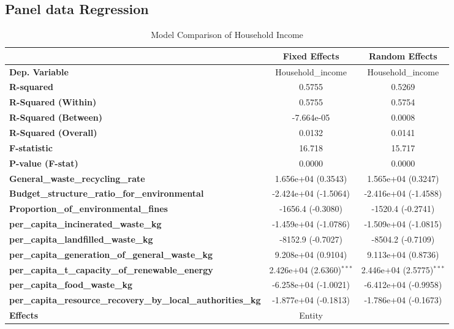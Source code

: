 \documentclass{article}
\begin{document}
\newpage
\subsection{Panel data Regression}
\begin{table}[H]
    \caption{Model Comparison of Household Income}
    \begin{tabular}{lcc}
    \toprule
     & \textbf{Fixed Effects} & \textbf{Random Effects} \\
    \midrule
    \textbf{Dep. Variable} & Household\_income & Household\_income \\
    \textbf{R-squared} & 0.5755 & 0.5269 \\
    \textbf{R-Squared (Within)} & 0.5755 & 0.5754 \\
    \textbf{R-Squared (Between)} & -7.664e-05 & 0.0008 \\
    \textbf{R-Squared (Overall)} & 0.0132 & 0.0141 \\
    \textbf{F-statistic} & 16.718 & 15.717 \\
    \textbf{P-value (F-stat)} & 0.0000 & 0.0000 \\
    \midrule
    \textbf{General\_waste\_recycling\_rate} & 1.656e+04 (0.3543) & 1.565e+04 (0.3247) \\
    \textbf{Budget\_structure\_ratio\_for\_environmental} & -2.424e+04 (-1.5064) & -2.416e+04 (-1.4588) \\
    \textbf{Proportion\_of\_environmental\_fines} & -1656.4 (-0.3080) & -1520.4 (-0.2741) \\
    \textbf{per\_capita\_incinerated\_waste\_kg} & -1.459e+04 (-1.0786) & -1.509e+04 (-1.0815) \\
    \textbf{per\_capita\_landfilled\_waste\_kg} & -8152.9 (-0.7027) & -8504.2 (-0.7109) \\
    \textbf{per\_capita\_generation\_of\_general\_waste\_kg} & 9.208e+04 (0.9104) & 9.113e+04 (0.8736) \\
    \textbf{per\_capita\_t\_capacity\_of\_renewable\_energy} & 2.426e+04 (2.6360)$^{***}$ & 2.446e+04 (2.5775)$^{***}$ \\
    \textbf{per\_capita\_food\_waste\_kg} & -6.258e+04 (-1.0021) & -6.412e+04 (-0.9958) \\
    \textbf{per\_capita\_resource\_recovery\_by\_local\_authorities\_kg} & -1.877e+04 (-0.1813) & -1.786e+04 (-0.1673) \\
    \midrule
    \textbf{Effects} & Entity & \\
    \bottomrule
    \end{tabular}
\end{table}
\end{document}
